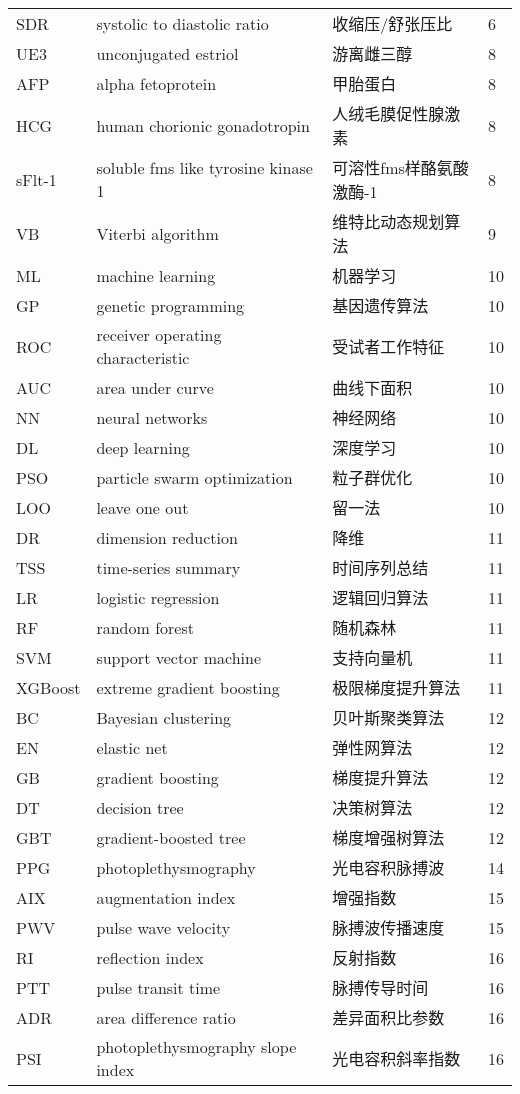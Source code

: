 \begin{center}
\begin{longtable}{m{2cm}m{7cm}m{5cm}m{1cm}<{\centering}}
        SDR     &  systolic to diastolic ratio & 收缩压/舒张压比 & 6\\
        UE3     & unconjugated estriol & 游离雌三醇 & 8\\
        AFP     & alpha fetoprotein     & 甲胎蛋白 & 8 \\
        HCG     & human chorionic gonadotropin  & 人绒毛膜促性腺激素    & 8 \\
        sFlt-1  & soluble fms like tyrosine kinase 1    & 可溶性fms样酪氨酸激酶-1 & 8\\
        VB   & Viterbi algorithm & 维特比动态规划算法 & 9 \\
        ML     & machine learning  & 机器学习  & 10    \\
        GP  & genetic programming   & 基因遗传算法  &10 \\
        ROC & receiver operating characteristic & 受试者工作特征  & 10 \\
        AUC & area under curve & 曲线下面积 & 10 \\

        NN & neural networks & 神经网络 & 10 \\
        DL & deep learning & 深度学习 & 10 \\
        PSO & particle swarm optimization & 粒子群优化 & 10 \\
        LOO & leave one out & 留一法 & 10 \\
        DR  & dimension reduction & 降维 & 11 \\
        TSS & time-series summary & 时间序列总结 & 11 \\
        LR  & logistic regression  & 逻辑回归算法 & 11 \\
        RF&random forest&随机森林 & 11\\
        SVM&support vector machine&支持向量机 & 11\\
        XGBoost & extreme gradient boosting & 极限梯度提升算法 & 11 \\
        BC & Bayesian clustering & 贝叶斯聚类算法 &12 \\
        EN & elastic net  & 弹性网算法 & 12 \\
        GB &  gradient boosting  & 梯度提升算法 & 12 \\
        DT & decision tree & 决策树算法 & 12\\
        GBT& gradient-boosted tree & 梯度增强树算法& 12\\

        PPG & photoplethysmography & 光电容积脉搏波 & 14 \\
        AIX & augmentation index & 增强指数 & 15 \\
        PWV & pulse wave velocity & 脉搏波传播速度&15 \\
        RI &reflection index & 反射指数 & 16 \\
        PTT & pulse transit time & 脉搏传导时间  & 16\\
        ADR & area difference ratio & 差异面积比参数 & 16 \\
        PSI & photoplethysmography slope index& 光电容积斜率指数& 16\\


\end{longtable}
\end{center}
